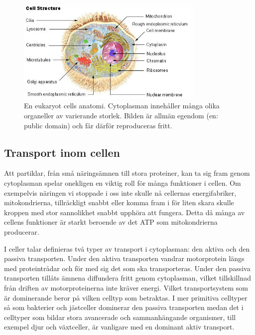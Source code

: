\begin{figure}\centering
\includegraphics[width=0.8\textwidth]{bilder/Illu_cell_structure.jpg}
\caption{En eukaryot cells anatomi. Cytoplasman innehåller många olika organeller av varierande storlek. \footnotesize Bilden är allmän egendom\cite{wiki:illu_cell_structure} (en: public domain) och får därför reproduceras fritt.}
\label{fig:cell_struktur}
\end{figure}


\subsection{Transport inom cellen}

Att partiklar, från små näringsämnen till stora proteiner, kan ta sig fram genom cytoplasman spelar onekligen en viktig roll för många funktioner i cellen. Om exempelvis näringen vi stoppade i oss inte skulle nå cellernas energifabriker, mitokondrierna, tillräckligt snabbt eller komma fram i för liten skara skulle kroppen med stor sannolikhet snabbt upphöra att fungera. Detta då många av cellens funktioner är starkt beroende av det ATP som mitokondrierna\footnotemark{} producerar.

I celler talar definieras två typer av transport i cytoplasman: den aktiva och den passiva transporten. Under den aktiva transporten vandrar motorprotein längs med proteintrådar och för med sig det som ska transporteras. Under den passiva transporten tillåts ämnena diffundera fritt genom cytoplasman, vilket tillskillnad från driften av motorproteinerna inte kräver energi. 
Vilket transportsystem som är dominerande beror på vilken celltyp som betraktas. I mer primitiva celltyper så som bakterier och jästceller dominerar den passiva transporten medan det i celltyper som bildar stora avancerade och sammanhängande organismer, till exempel djur och växtceller, är vanligare med en dominant aktiv transport. 

